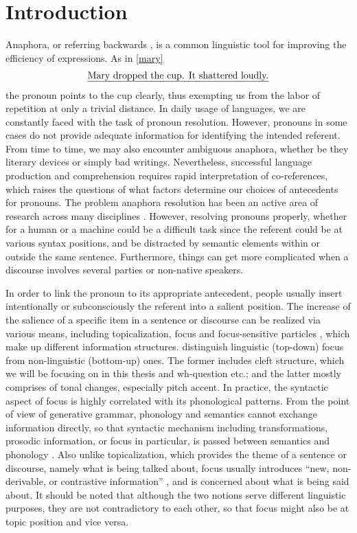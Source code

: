 \chapter{Introduction}
Anaphora, or referring backwards \citep{mitkov1999}, is a common linguistic tool for improving the efficiency of expressions. As in \eqref{mary}
\begin{align}
 \mbox{\emph{Mary dropped the cup. It shattered loudly.}} \label{mary}
\end{align}
the pronoun points to the cup clearly, thus exempting us from the labor of repetition at only a trivial distance. In daily usage of languages, we are constantly faced with the task of pronoun resolution. However, pronouns in some cases do not provide adequate information for identifying the intended referent. From time to time, we may also encounter ambiguous anaphora, whether be they literary devices or simply bad writings. Nevertheless, successful language production and comprehension requires rapid interpretation of co-references, which raises the questions of what factors determine our choices of antecedents for pronouns. The problem anaphora resolution has been an active area of research across many disciplines \citep{sayed2003}. However, resolving pronouns properly, whether for a human or a machine could be a difficult task since the referent could be at various syntax positions, and be distracted by semantic elements within or outside the same sentence. Furthermore, things can get more complicated when a discourse involves several parties or non-native speakers. 

In order to link the pronoun to its appropriate antecedent, people usually insert intentionally or subconsciously the referent into a salient position. The increase of the salience of a specific item in a sentence or discourse can be realized via various means, including topicalization, focus and focus-sensitive particles \citep{patterson2017}, which make up different information structures. \citet{徐晓东2014} distinguish linguistic (top-down) focus from non-linguistic (bottom-up) ones. The former includes cleft structure, which we will be focusing on in this thesis and wh-question etc.; and the latter mostly comprises of tonal changes, especially pitch accent. In practice, the syntactic aspect of focus is highly correlated with its phonological patterns. From the point of view of generative grammar, phonology and semantics cannot exchange information directly, so that syntactic mechanism including transformations, prosodic information, or focus in particular, is passed between semantics and phonology \citep{beaver2008}. Also unlike topicalization, which provides the theme of a sentence or discourse, namely what is being talked about, focus usually introduces “new, non-derivable, or contrastive information” \citep{halliday1967}, and is concerned about what is being said about. It should be noted that although the two notions serve different linguistic purposes, they are not contradictory to each other, so that focus might also be at topic position and vice versa.

